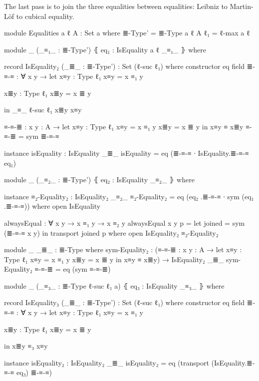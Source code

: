 \documentclass{article}
\begin{document}
The last pass is to join the three equalities between equalities:
Leibniz to Martin-Löf to cubical equality.

\begin{code}
module Equalities {a ℓ} {A : Set a} where
  ≣-Type' = ≣-Type {a} {ℓ} {A}
  ℓ₁ = ℓ-max a ℓ

  module _
    (_≡₁_ : ≣-Type')
    ⦃ eq₁ : IsEquality {a} {ℓ} _≡₁_ ⦄
    where

    record IsEquality₂ (_≣_ : ≣-Type') : Set (ℓ-suc ℓ₁) where
      constructor eq
      field
        ≣-≡-≡ : ∀ {x y} → let
          x≡y : Type ℓ₁
          x≡y = x ≡₁ y

          x≣y : Type ℓ₁
          x≣y = x ≣ y

          in _≡_ {ℓ-suc ℓ₁} x≣y x≡y

      ≡-≡-≣ : {x y : A} → let
        x≡y : Type ℓ₁
        x≡y = x ≡₁ y
        x≣y = x ≣ y
        in x≡y ≡ x≣y
      ≡-≡-≣ = sym ≣-≡-≡

      instance
        isEquality : IsEquality _≣_
        isEquality = eq (≣-≡-≡ ∙ IsEquality.≣-≡-≡ eq₁)

    module _
      (_≡₂_ : ≣-Type')
      ⦃ eq₂ : IsEquality _≡₂_ ⦄
      where

      instance
        ≡₂-Equality₂ : IsEquality₂ _≡₂_
        ≡₂-Equality₂ = eq (eq₂ .≣-≡-≡ ∙ sym (eq₁ .≣-≡-≡))
          where open IsEquality

      alwaysEqual : ∀ {x y} →  x ≡₁ y → x ≡₂ y
      alwaysEqual {x} {y} p =
        let joined = sym (≣-≡-≡ {x} {y})
        in transport joined p
        where open IsEquality₂ ≡₂-Equality₂

      module _ {_≣_ : ≣-Type} where
        sym-Equality₂ : (≡-≡-≣ : {x y : A} → let
          x≡y : Type ℓ₁
          x≡y = x ≡₁ y
          x≣y = x ≣ y
          in x≡y ≡ x≣y)
          → IsEquality₂ _≣_
        sym-Equality₂ ≡-≡-≣ = eq (sym ≡-≡-≣)

    module _
      (_≡₃_ : ≣-Type {ℓ-suc ℓ₁} {a})
      ⦃ eq₃ : IsEquality _≡₃_ ⦄
      where

      record IsEquality₃ (_≣_ : ≣-Type') : Set (ℓ-suc ℓ₁) where
        constructor eq
        field
          ≣-≡-≡ : ∀ {x y} → let
            x≡y : Type ℓ₁
            x≡y = x ≡₁ y

            x≣y : Type ℓ₁
            x≣y = x ≣ y

            in x≣y ≡₃ x≡y

        instance
          isEquality₂ : IsEquality₂ _≣_
          isEquality₂ = eq (transport (IsEquality.≣-≡-≡ eq₃) ≣-≡-≡)


\end{code}
\end{document}
